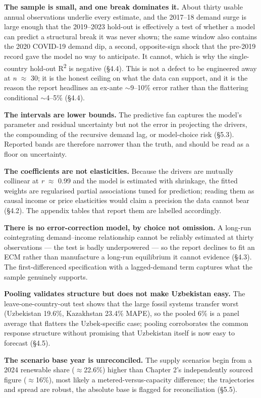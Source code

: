 \documentclass[10pt,twocolumn]{article}
\begin{document}
\textbf{The sample is small, and one break dominates it.} About thirty usable annual observations underlie every estimate, and the 2017--18 demand surge is large enough that the 2019--2023 hold-out is effectively a test of whether a model can predict a structural break it was never shown; the same window also contains the 2020 COVID-19 demand dip, a second, opposite-sign shock that the pre-2019 record gave the model no way to anticipate. It cannot, which is why the single-country hold-out R\textsuperscript{2} is negative (\S{}4.4). This is not a defect to be engineered away at \textit{n} $\approx$ 30; it is the honest ceiling on what the data can support, and it is the reason the report headlines an ex-ante $\sim$9--10\% error rather than the flattering conditional $\sim$4--5\% (\S{}4.4).

\textbf{The intervals are lower bounds.} The predictive fan captures the model's parameter and residual uncertainty but not the error in projecting the drivers, the compounding of the recursive demand lag, or model-choice risk (\S{}5.3). Reported bands are therefore narrower than the truth, and should be read as a floor on uncertainty.

\textbf{The coefficients are not elasticities.} Because the drivers are mutually collinear at \textit{r} $\approx$ 0.99 and the model is estimated with shrinkage, the fitted weights are regularised partial associations tuned for prediction; reading them as causal income or price elasticities would claim a precision the data cannot bear (\S{}4.2). The appendix tables that report them are labelled accordingly.

\textbf{There is no error-correction model, by choice not omission.} A long-run cointegrating demand--income relationship cannot be reliably estimated at thirty observations --- the test is badly underpowered --- so the report declines to fit an ECM rather than manufacture a long-run equilibrium it cannot evidence (\S{}4.3). The first-differenced specification with a lagged-demand term captures what the sample genuinely supports.

\textbf{Pooling validates structure but does not make Uzbekistan easy.} The leave-one-country-out test shows that the large fossil systems transfer worst (Uzbekistan 19.6\%, Kazakhstan 23.4\% MAPE), so the pooled 6\% is a panel average that flatters the Uzbek-specific case; pooling corroborates the common response structure without promising that Uzbekistan itself is now easy to forecast (\S{}4.5).

\textbf{The scenario base year is unreconciled.} The supply scenarios begin from a 2024 renewable share ($\approx$22.6\%) higher than Chapter 2's independently sourced figure ($\approx$16\%), most likely a metered-versus-capacity difference; the trajectories and spread are robust, the absolute base is flagged for reconciliation (\S{}5.5).
\end{document}

